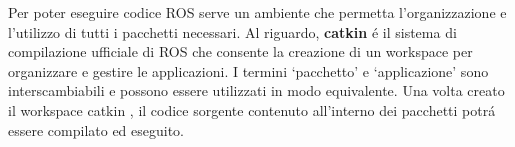 Per poter eseguire codice ROS serve un ambiente che permetta l'organizzazione e l'utilizzo di tutti i pacchetti necessari.
Al riguardo, \textbf{catkin} \'{e} il sistema di compilazione ufficiale di ROS che consente la creazione di un workspace per 
organizzare e gestire le applicazioni.
I termini `pacchetto' e `applicazione' sono interscambiabili e possono essere utilizzati in modo equivalente.
Una volta creato il workspace catkin \cite{catkin_ws}, il codice sorgente contenuto all'interno dei pacchetti potr\'{a} essere 
compilato ed eseguito.
